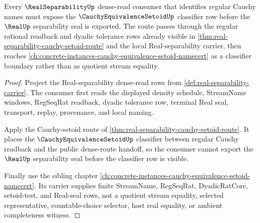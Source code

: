 \begin{theorem}
\label{thm:real-separability-cauchy-setoid-forward-route}
Every $\RealSeparabilityUp$ dense-read consumer that identifies regular Cauchy names must expose the $\CauchyEquivalenceSetoidUp$ classifier row before the $\RealUp$ separability seal is exported. The route passes through the regular rational readback and dyadic tolerance rows already visible in \autoref{thm:real-separability-cauchy-setoid-route} and the local Real-separability carrier, then reaches \autoref{ch:concrete-instances-cauchy-equivalence-setoid-namecert} as a classifier boundary rather than as quotient stream equality.
\end{theorem}
\begin{proof}
Project the Real-separability dense-read rows from \autoref{def:real-separability-carrier}. The consumer first reads the displayed density schedule, StreamName windows, RegSeqRat readback, dyadic tolerance row, terminal Real seal, transport, replay, provenance, and local naming.

Apply the Cauchy-setoid route of \autoref{thm:real-separability-cauchy-setoid-route}. It places the $\CauchyEquivalenceSetoidUp$ classifier between regular Cauchy readback and the public dense-route handoff, so the consumer cannot export the $\RealUp$ separability seal before the classifier row is visible.

Finally use the sibling chapter \autoref{ch:concrete-instances-cauchy-equivalence-setoid-namecert}. Its carrier supplies finite StreamName, RegSeqRat, DyadicRatCore, setoid-test, and Real-seal rows, not a quotient stream equality, selected representative, countable-choice selector, host real equality, or ambient completeness witness.
\end{proof}
